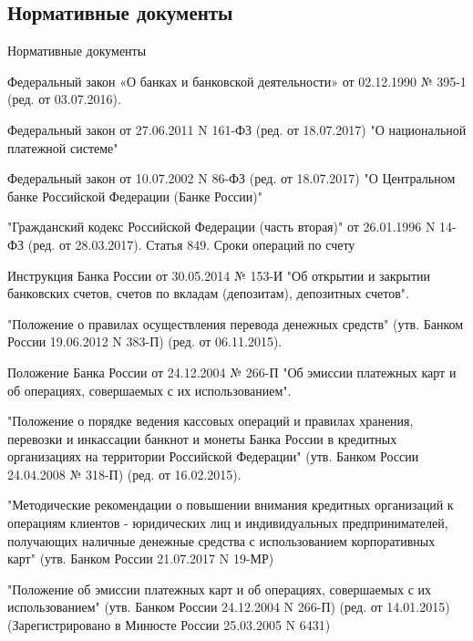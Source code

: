 \documentclass[_Banking_p3.tex]{subfiles}
\begin{document}

\subsection{Нормативные документы}
\begin{frame}[allowframebreaks]{Нормативные документы}
  \begin{thebibliography}{10}
  
  \beamertemplatearticlebibitems
Федеральный закон «О банках и банковской деятельности» от 02.12.1990 № 395-1 (ред. от 03.07.2016).

Федеральный закон от 27.06.2011 N 161-ФЗ (ред. от 18.07.2017) "О национальной платежной системе"

\pagebreak

Федеральный закон от 10.07.2002 N 86-ФЗ (ред. от 18.07.2017) "О Центральном банке Российской Федерации (Банке России)"

"Гражданский кодекс Российской Федерации (часть вторая)" от 26.01.1996 N 14-ФЗ (ред. от 28.03.2017). Статья 849. Сроки операций по счету


\pagebreak

Инструкция Банка России от 30.05.2014 № 153-И "Об открытии и закрытии банковских счетов, счетов по вкладам (депозитам), депозитных счетов".

"Положение о правилах осуществления перевода денежных средств" (утв. Банком России 19.06.2012 N 383-П) (ред. от 06.11.2015).

\pagebreak

Положение Банка России от 24.12.2004 № 266-П "Об эмиссии платежных карт и об операциях, совершаемых с их использованием".


"Положение о порядке ведения кассовых операций и правилах хранения, перевозки и инкассации банкнот и монеты Банка России в кредитных организациях на территории Российской Федерации" (утв. Банком России 24.04.2008 № 318-П) (ред. от 16.02.2015).


\pagebreak

"Методические рекомендации о повышении внимания кредитных организаций к операциям клиентов - юридических лиц и индивидуальных предпринимателей, получающих наличные денежные средства с использованием корпоративных карт" (утв. Банком России 21.07.2017 N 19-МР)

"Положение об эмиссии платежных карт и об операциях, совершаемых с их использованием" (утв. Банком России 24.12.2004 N 266-П) (ред. от 14.01.2015) (Зарегистрировано в Минюсте России 25.03.2005 N 6431)


\end{thebibliography}
\end{frame}
\end{document}

